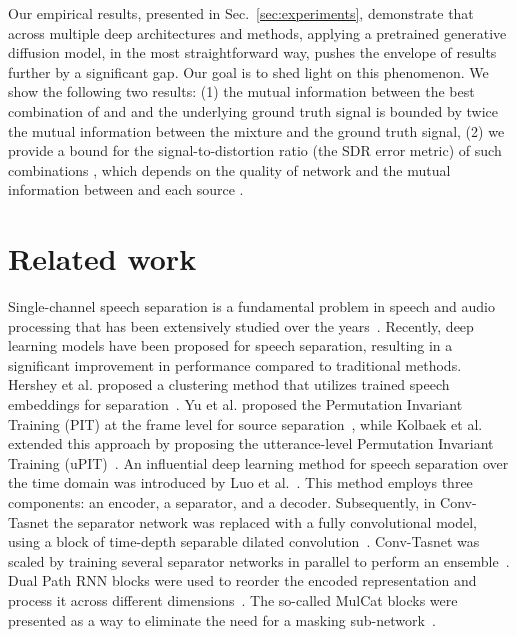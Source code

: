 \documentclass{article}
\theoremstyle{plain}
\theoremstyle{definition}
\theoremstyle{remark}
\begin{document}
Our empirical results, presented in Sec.~\ref{sec:experiments}, demonstrate that across multiple deep architectures and methods, applying a pretrained generative diffusion model, in the most straightforward way, pushes the envelope of results further by a significant gap. Our goal is to shed light on this phenomenon. We show the following two results:
(1) the mutual information between the best combination of  and  and the underlying ground truth signal  is bounded by twice the mutual information between the mixture and the ground truth signal, (2) we provide a bound for the signal-to-distortion ratio (the SDR error metric) of such combinations , which depends on the quality of network  and the mutual information between  and each source .








\section{Related work}

Single-channel speech separation is a fundamental problem in speech and audio processing that has been extensively studied over the years~\cite{logeshwari2012survey,martin2018single}. 
Recently, deep learning models have been proposed for speech separation, resulting in a significant improvement in performance compared to traditional methods. Hershey et al. proposed a clustering method that utilizes trained speech embeddings for separation~\cite{hershey2016deep}. Yu et al. proposed the Permutation Invariant Training (PIT) at the frame level for source separation~\cite{yu2017permutation}, while Kolbaek et al. extended this approach by proposing the utterance-level Permutation Invariant Training (uPIT)~\cite{kolbaek2017multitalker}.
An influential deep learning method for  speech separation over the time domain was introduced by Luo et al.~\cite{luo2018tasnet}. This method employs three components: an encoder, a separator, and a decoder. Subsequently, in Conv-Tasnet the separator network was replaced with a fully convolutional model, using a block of time-depth separable dilated convolution~\cite{luo2019conv}. Conv-Tasnet was scaled by training several separator networks in parallel to perform an ensemble~\cite{zhang2020furcanext}. Dual Path RNN blocks were used to reorder the encoded representation and process it across different dimensions~\cite{luo2019dual}.  The so-called MulCat blocks were presented as a way to eliminate the need for a masking sub-network~\cite{pmlr-v119-nachmani20a}. 
\end{document}
